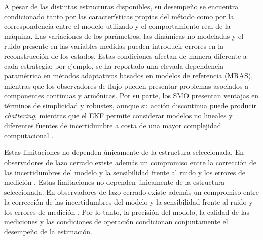 A pesar de las distintas estructuras disponibles, su desempeño se encuentra condicionado tanto por las características propias del método como por la correspondencia entre el modelo utilizado y el comportamiento real de la máquina. Las variaciones de los parámetros, las dinámicas no modeladas y el ruido presente en las variables medidas pueden introducir errores en la reconstrucción de los estados. Estas condiciones afectan de manera diferente a cada estrategia; por ejemplo, se ha reportado una elevada dependencia paramétrica en métodos adaptativos basados en modelos de referencia (MRAS), mientras que los observadores de flujo pueden presentar problemas asociados a componentes continuas y armónicas. Por su parte, los SMO presentan ventajas en términos de simplicidad y robustez, aunque su acción discontinua puede producir \textit{chattering}, mientras que el EKF permite considerar modelos no lineales y diferentes fuentes de incertidumbre a costa de una mayor complejidad computacional \cite{luoOptimizedLuenbergerObserverBased2022}.

Estas limitaciones no dependen únicamente de la estructura seleccionada. En observadores de lazo cerrado existe además un compromiso entre la corrección de las incertidumbres del modelo y la sensibilidad frente al ruido y los errores de medición \cite{wangPositionSensorlessPermanent2020}. Estas limitaciones no dependen únicamente de la estructura seleccionada.
En observadores de lazo cerrado existe además un compromiso entre la corrección
de las incertidumbres del modelo y la sensibilidad frente al ruido y los
errores de medición \cite{wangPositionSensorlessPermanent2020}. Por lo tanto,
la precisión del modelo, la calidad de las mediciones y las condiciones de
operación condicionan conjuntamente el desempeño de la estimación.
%
%
%
%
%
%
%
%

